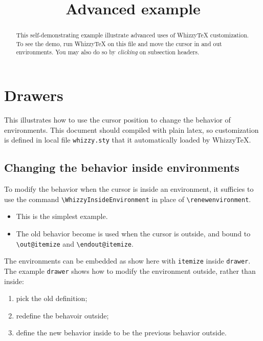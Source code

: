 \documentclass{article}
\title {Advanced example}
\newenvironment{drawer}[1]{\subsection{#1}}{}
\begin{document}
\maketitle
\begin{abstract}
This self-demonstrating example illustrate advanced uses of {WhizzyTeX}
customization. To see the demo, run WhizzyTeX on this file and move the
cursor in and out environments. You may also do so by \emph{clicking}
on subsection headers.
\end{abstract}

\section{Drawers}

This illustrates how to use the cursor position to change the behavior of
environments. This document should compiled with plain latex, so
customization is defined in local file \verb"whizzy.sty" that it
automatically loaded by WhizzyTeX.

\begin{drawer}{Changing the behavior inside environments}
To modify the behavior when the cursor is inside an environment, it
sufficies to use the command \verb"\WhizzyInsideEnvironment" 
in place of \verb"\renewenvironment". 
\begin{itemize}
\item This is the simplest example. 
\item The old behavior become is used when the cursor is outside, and bound
to \verb"\out@itemize" and \verb"\endout@itemize". 
\end{itemize}
The environments can be embedded as show here with \verb"itemize" inside
\verb"drawer". 
The example \verb"drawer" shows how to modify the environment outside,
rather than inside: 
\begin{enumerate}
\item pick the old definition;
\item redefine the behavoir outside;
\item define the new behavior inside to be the previous behavior outside.
\end{enumerate}
\end{drawer}
\end{document}
